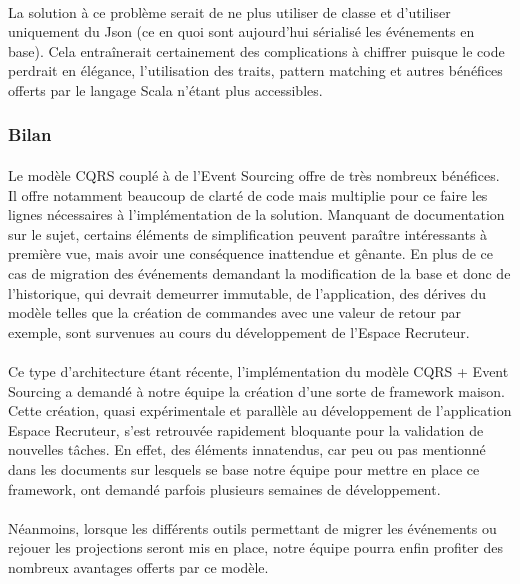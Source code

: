 \paragraph{}
La solution à ce problème serait de ne plus utiliser de classe et d'utiliser uniquement du Json (ce en quoi sont aujourd'hui sérialisé les événements en base).
Cela entraînerait certainement des complications à chiffrer puisque le code perdrait en élégance, l'utilisation des traits, pattern matching et autres bénéfices offerts par le langage Scala n'étant plus accessibles.
\subsubsection{Bilan}
\paragraph{}
Le modèle CQRS couplé à de l'Event Sourcing offre de très nombreux bénéfices.
Il offre notamment beaucoup de clarté de code mais multiplie pour ce faire les lignes nécessaires à l'implémentation de la solution.
Manquant de documentation sur le sujet, certains éléments de simplification peuvent paraître intéressants à première vue, mais avoir une conséquence inattendue et gênante.
En plus de ce cas de migration des événements demandant la modification de la base et donc de l'historique, qui devrait demeurrer immutable, de l'application, des dérives du modèle telles que la création de commandes avec une valeur de retour par exemple, sont survenues au cours du développement de l'Espace Recruteur.
\paragraph{}
Ce type d'architecture étant récente, l'implémentation du modèle CQRS + Event Sourcing a demandé à notre équipe la création d'une sorte de framework maison.
Cette création, quasi expérimentale et parallèle au développement de l'application Espace Recruteur, s'est retrouvée rapidement bloquante pour la validation de nouvelles tâches.
En effet, des éléments innatendus, car peu ou pas mentionné dans les documents sur lesquels se base notre équipe pour mettre en place ce framework, ont demandé parfois plusieurs semaines de développement.
\paragraph{}
Néanmoins, lorsque les différents outils permettant de migrer les événements ou rejouer les projections seront mis en place, notre équipe pourra enfin profiter des nombreux avantages offerts par ce modèle.
